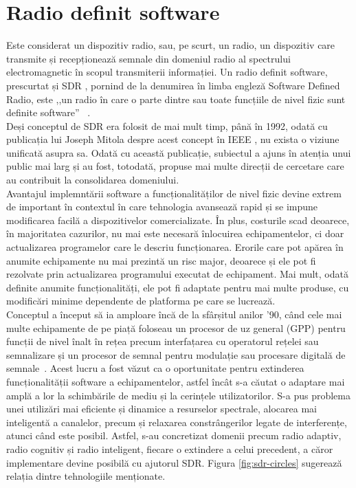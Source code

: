 \section{Radio definit software}
\label{sec:sdr}

Este considerat un dispozitiv radio, sau, pe scurt, un radio, un dispozitiv care
transmite și recepționează semnale din domeniul radio al spectrului
electromagnetic în scopul transmiterii informației. Un radio definit software,
prescurtat și SDR , pornind de la denumirea
în limba engleză Software Defined Radio, este ,,un radio în care o parte
dintre sau toate funcțiile de nivel fizic sunt definite software''
~\cite{sdr-def}. \\

Deși conceptul de SDR era folosit de mai mult timp, până în 1992, odată cu
publicația lui Joseph Mitola despre acest concept în IEEE \cite{mitola-sdr}, nu
exista o viziune unificată asupra sa. Odată cu această publicație,
subiectul a ajuns în atenția unui public mai larg și au fost, totodată, propuse
mai multe direcții de cercetare care au contribuit la consolidarea domeniului. \\

Avantajul implemntării software a funcționalităților de nivel fizic devine
extrem de important în contextul în care tehnologia avansează rapid și se impune
modificarea facilă a dispozitivelor comercializate. În plus, costurile scad
deoarece, în majoritatea cazurilor, nu mai este necesară înlocuirea
echipamentelor, ci doar actualizarea programelor care le descriu funcționarea.
Erorile care pot apărea în anumite echipamente nu mai prezintă un risc major,
deoarece și ele pot fi rezolvate prin actualizarea programului executat de
echipament. Mai mult, odată definite anumite funcționalități, ele pot fi
adaptate pentru mai multe produse, cu modificări minime dependente de platforma
pe care se lucrează. \\

Conceptul a început să ia amploare încă de la sfârșitul anilor '90, când cele
mai multe echipamente de pe piață foloseau un procesor de uz general (GPP)
 pentru funcții de nivel înalt în rețea
precum interfațarea cu operatorul rețelei sau semnalizare și un procesor de
semnal pentru modulație sau procesare digitală de
semnale~\cite{arslan2007cognitive}. Acest lucru a fost văzut ca o oportunitate
pentru extinderea funcționalității software a echipamentelor, astfel încât s-a
căutat o adaptare mai amplă a lor la schimbările de mediu și la cerințele
utilizatorilor. S-a pus problema unei utilizări mai eficiente și dinamice a
resurselor spectrale, alocarea mai inteligentă a canalelor, precum și relaxarea
constrângerilor legate de interferențe, atunci când este posibil. Astfel, s-au
concretizat domenii precum radio adaptiv, radio cognitiv și radio inteligent,
fiecare o extindere a celui precedent, a căror implementare devine posibilă cu
ajutorul SDR. Figura \ref{fig:sdr-circles} sugerează relația dintre tehnologiile
menționate. \\

